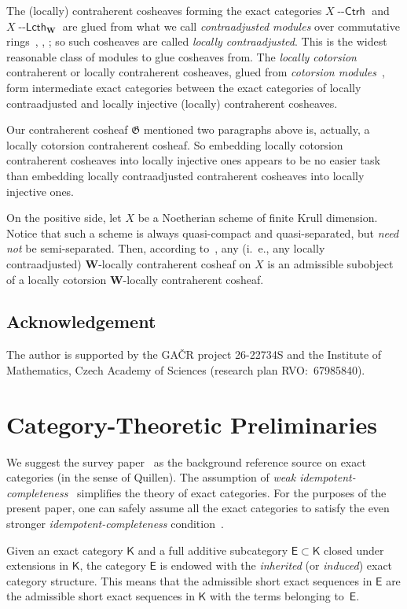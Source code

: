 \documentclass[12pt,a4paper]{amsart}
\newcommand{\+}{\nobreakdash-}
\renewcommand{\:}{\colon}
\newcommand{\Ctrh}{{\operatorname{\mathsf{--Ctrh}}}}
\newcommand{\Lcth}{{\operatorname{\mathsf{--Lcth}}}}
\newcommand{\bW}{\mathbf W}
\newcommand{\fG}{\mathfrak G}
\newcommand{\sK}{\mathsf K}
\newcommand{\sE}{\mathsf E}
\newcommand{\Section}[1]{\bigskip\section{#1}\medskip}
\theoremstyle{plain}
\theoremstyle{definition}
\begin{document}
 The (locally) contraherent cosheaves forming the exact categories
$X\Ctrh$ and $X\Lcth_\bW$ are glued from what we call
\emph{contraadjusted modules} over commutative
rings~\cite[Section~1.1]{Pcosh}, \cite{ST}, \cite{Pcta}; so such
cosheaves are called \emph{locally contraadjusted}.
 This is the widest reasonable class of modules to glue cosheaves from.
 The \emph{locally cotorsion} contraherent or locally contraherent
cosheaves, glued from \emph{cotorsion modules}~\cite{En2},
form intermediate exact categories between the exact categories of
locally contraadjusted and locally injective (locally) contraherent
cosheaves.

 Our contraherent cosheaf $\fG$ mentioned two paragraphs above is,
actually, a locally cotorsion contraherent cosheaf.
 So embedding locally cotorsion contraherent cosheaves into locally
injective ones appears to be no easier task than embedding locally
contraadjusted contraherent cosheaves into locally injective ones.

 On the positive side, let $X$ be a Noetherian scheme of finite Krull
dimension.
 Notice that such a scheme is always quasi-compact and quasi-separated,
but \emph{need not} be semi-separated.
 Then, according to~\cite[Proposition~4.7.11]{Pform}, any (i.~e., any
locally contraadjusted) $\bW$\+locally contraherent cosheaf on $X$ is
an admissible subobject of a locally cotorsion $\bW$\+locally
contraherent cosheaf.

\subsection*{Acknowledgement}
 The author is supported by the GA\v CR project 26-22734S
and the Institute of Mathematics, Czech Academy of Sciences
(research plan RVO:~67985840).


\Section{Category-Theoretic Preliminaries}

 We suggest the survey paper~\cite{Bueh} as the background reference
source on exact categories (in the sense of Quillen).
 The assumption of \emph{weak
idempotent-completeness}~\cite[Section~7]{Bueh} simplifies
the theory of exact categories.
 For the purposes of the present paper, one can safely assume all
the exact categories to satisfy the even stronger
\emph{idempotent-completeness} condition~\cite[Section~6]{Bueh}.

 Given an exact category $\sK$ and a full additive subcategory
$\sE\subset\sK$ closed under extensions in $\sK$, the category $\sE$
is endowed with the \emph{inherited} (or \emph{induced}) exact
category structure.
 This means that the admissible short exact sequences in $\sE$ are
the admissible short exact sequences in $\sK$ with the terms belonging
to~$\sE$.
\end{document}
